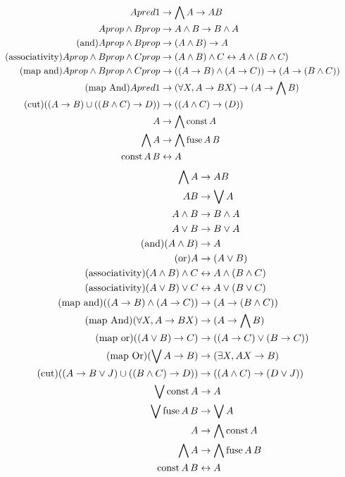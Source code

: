 \documentclass{article}
\begin{document}
  \begin{align*}
    A pred1 &\to \bigwedge A \to AB\\
    A prop \wedge B prop &\to A \wedge B \to B \wedge A\\
    \tag{and}
    A prop \wedge B prop &\to (A \wedge B) \to A\\
    \tag{associativity}
    A prop \wedge B prop \wedge C prop &\to (A \wedge B) \wedge C \leftrightarrow A \wedge (B \wedge C)\\
    \tag{map and}
    A prop \wedge B prop \wedge C prop &\to ((A \to B) \wedge (A \to C)) \to (A \to (B \wedge C))\\
    \tag{map And}
    A pred1 &\to (\forall X, A \to B X) \to (A \to \bigwedge B)\\
    \tag{cut}
    ((A \to B) \cup ((B \wedge C) \to D)) &\to ((A \wedge C) \to (D))\\
    A &\to \bigwedge \operatorname{\mathrm{const}} A\\
    \bigwedge A &\to \bigwedge \operatorname{\mathrm{fuse}} A\,B\\
    \operatorname{\mathrm{const}} A\,B &\leftrightarrow A
  \end{align*}
  \begin{align*}
    \bigwedge A &\to AB\\
    AB &\to \bigvee A\\
    A \wedge B &\to B \wedge A\\
    A \vee B &\to B \vee A\\
    \tag{and}
    (A \wedge B) &\to A\\
    \tag{or}
    A &\to (A \vee B)\\
    \tag{associativity}
    (A \wedge B) \wedge C &\leftrightarrow A \wedge (B \wedge C)\\
    \tag{associativity}
    (A \vee B) \vee C &\leftrightarrow A \vee (B \vee C)\\
    \tag{map and}
    ((A \to B) \wedge (A \to C)) &\to (A \to (B \wedge C))\\
    \tag{map And}
    (\forall X, A \to B X) &\to (A \to \bigwedge B)\\
    \tag{map or}
    ((A \vee B) \to C) &\to ((A \to C) \vee (B \to C))\\
    \tag{map Or}
    (\bigvee A \to B) &\to (\exists X, A X \to B)\\
    \tag{cut}
    ((A \to B \vee J) \cup ((B \wedge C) \to D)) &\to ((A \wedge C) \to (D \vee J))\\
    \bigvee \operatorname{\mathrm{const}} A &\to A\\
    \bigvee \operatorname{\mathrm{fuse}} A\, B &\to \bigvee A\\
    A &\to \bigwedge \operatorname{\mathrm{const}} A\\
    \bigwedge A &\to \bigwedge \operatorname{\mathrm{fuse}} A\,B\\
    \operatorname{\mathrm{const}} A\,B &\leftrightarrow A
  \end{align*}
\end{document}
